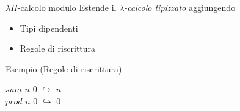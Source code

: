 \documentclass{beamer}
\begin{document}
\begin{frame}{$\lambda\Pi$-calcolo modulo}
  Estende il \textit{$\lambda$-calcolo tipizzato} aggiungendo
\begin{itemize}
  \vspace{1em}
  \item Tipi dipendenti 
  \vspace{1em}
  \item Regole di riscrittura
\end{itemize}
\pause
\begin{exampleblock}{Esempio (Regole di riscrittura)}
\begin{center}
  $sum$ $n$ $0$ $\hookrightarrow$ $n$ \\
  \vspace{1em}
  $prod $ $n$ $0$ $\hookrightarrow$ $0$
\end{center}
\end{exampleblock}
\end{frame}
\end{document}
